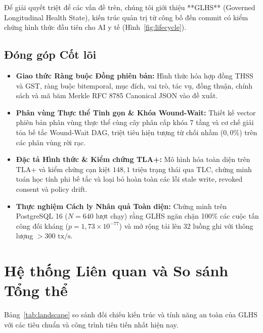 \documentclass[11pt,a4paper]{article}
\begin{document}
Để giải quyết triệt để các vấn đề trên, chúng tôi giới thiệu **GLHS** (Governed Longitudinal Health State), kiến trúc quản trị từ công bố đến commit có kiểm chứng hình thức đầu tiên cho AI y tế (Hình~\ref{fig:lifecycle}).

\subsection{Đóng góp Cốt lõi}
\begin{itemize}
  \item \textbf{Giao thức Ràng buộc Đồng phiên bản:} Hình thức hóa hợp đồng THSS và GST, ràng buộc bitemporal, mục đích, vai trò, tác vụ, đồng thuận, chính sách và mã băm Merkle RFC 8785 Canonical JSON vào đề xuất.
  \item \textbf{Phân vùng Thực thể Tinh gọn \& Khóa Wound-Wait:} Thiết kế vector phiên bản phân vùng thực thể cùng cây phân cấp khóa 7 tầng và cơ chế giải tỏa bế tắc Wound-Wait DAG, triệt tiêu hiện tượng từ chối nhầm ($0{,}0\%$) trên các phân vùng rời rạc.
  \item \textbf{Đặc tả Hình thức \& Kiểm chứng TLA+:} Mô hình hóa toàn diện trên TLA+ và kiểm chứng cạn kiệt $148{,}1\text{ triệu}$ trạng thái qua TLC, chứng minh toán học tính phi bế tắc và loại bỏ hoàn toàn các lỗi stale write, revoked consent và policy drift.
  \item \textbf{Thực nghiệm Cách ly Nhân quả Toàn diện:} Chứng minh trên PostgreSQL 16 ($N=640$ lượt chạy) rằng GLHS ngăn chặn 100\% các cuộc tấn công đối kháng ($p = 1{,}73 \times 10^{-77}$) và mở rộng tải lên 32 luồng ghi với thông lượng $>300\text{ tx/s}$.
\end{itemize}

\section{Hệ thống Liên quan và So sánh Tổng thể}
Bảng~\ref{tab:landscape} so sánh đối chiếu kiến trúc và tính năng an toàn của GLHS với các tiêu chuẩn và công trình tiên tiến nhất hiện nay.
\end{document}
